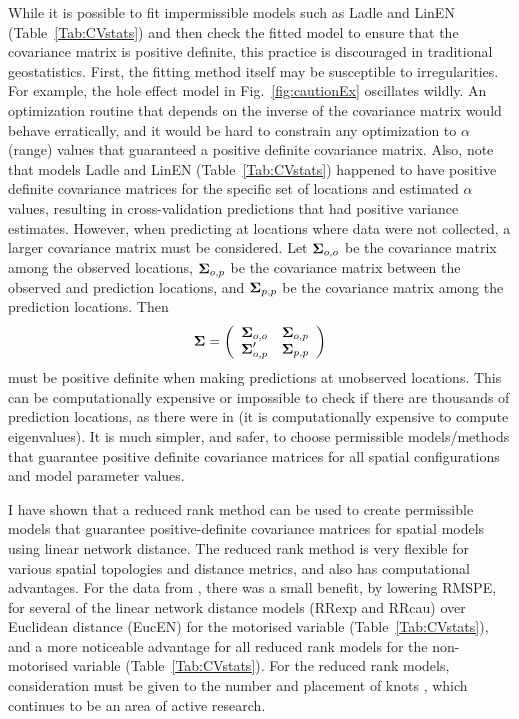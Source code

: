 \documentclass[11pt, titlepage]{article}\usepackage[]{graphicx}\usepackage[]{color}
\begin{document}
\begin{spacing}{1.9}
\begin{flushleft}
While it is possible to fit impermissible models such as Ladle and LinEN (Table~\ref{Tab:CVstats}) and then check the fitted model to ensure that the covariance matrix is positive definite, this practice is discouraged in traditional geostatistics.  First, the fitting method itself may be susceptible to irregularities. For example, the hole effect model in Fig.~\ref{fig:cautionEx} oscillates wildly.  An optimization routine that depends on the inverse of the covariance matrix would behave erratically, and it would be hard to constrain any optimization to $\alpha$ (range) values that guaranteed a positive definite covariance matrix.  Also, note that models Ladle and LinEN (Table~\ref{Tab:CVstats}) happened to have positive definite covariance matrices for the specific set of locations and estimated $\alpha$ values, resulting in cross-validation predictions that had positive variance estimates.  However, when predicting at locations where data were not collected, a larger covariance matrix must be considered.  Let $\mbox{\boldmath $\Sigma$}_{o,o}$ be the covariance matrix among the observed locations, $\mbox{\boldmath $\Sigma$}_{o,p}$ be the covariance matrix between the observed and prediction locations, and $\mbox{\boldmath $\Sigma$}_{p,p}$  be the covariance matrix among the prediction locations. Then
\[
				\mbox{\boldmath $\Sigma$} = \left(
					\begin{array}{cc}
									\mbox{\boldmath $\Sigma$}_{o,o} & \mbox{\boldmath $\Sigma$}_{o,p} \\
									\mbox{\boldmath $\Sigma$}_{o,p}^{\prime} & \mbox{\boldmath $\Sigma$}_{p,p}
					\end{array}
				\right)
\]
must be positive definite when making predictions at unobserved locations. This can be computationally expensive or impossible to check if there are thousands of prediction locations, as there were in \citet{Ladl:Avga:Whea:Boyc:pred:2016} (it is computationally expensive to compute eigenvalues). It is much simpler, and safer, to choose permissible models/methods that guarantee positive definite covariance matrices for all spatial configurations and model parameter values. 

I have shown that a reduced rank method can be used to create permissible models that guarantee positive-definite covariance matrices for spatial models using linear network distance.  The reduced rank method is very flexible for various spatial topologies and distance metrics, and also has computational advantages.  For the data from \citet{Ladl:Avga:Whea:Boyc:pred:2016}, there was a small benefit, by lowering RMSPE, for several of the linear network distance models (RRexp and RRcau) over Euclidean distance (EucEN) for the motorised variable (Table~\ref{Tab:CVstats}), and a more noticeable advantage for all reduced rank models for the non-motorised variable (Table~\ref{Tab:CVstats}).  For the reduced rank models, consideration must be given to the number and placement of knots \citep{Rupp:Wand:Carr:semi:2003, Gelf:Bane:Finl:spat:2012}, which continues to be an area of active research.


\end{flushleft}
\end{spacing}
\end{document}
